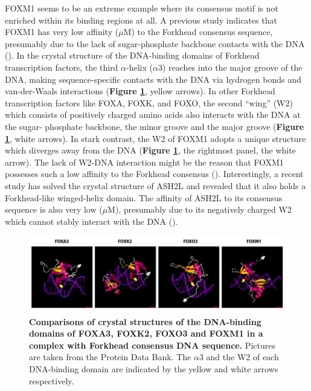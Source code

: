 FOXM1 seems to be an extreme example where its consensus motif is not enriched within its binding regions at all. A previous study indicates that FOXM1 has very low affinity ($\mu$M) to the Forkhead consensus sequence, presumably due to the lack of sugar-phosphate backbone contacts with the DNA (\cite{littler2010structure}). In the crystal structure of the DNA-binding domains of Forkhead transcription factors, the third $\alpha$-helix ($\alpha$3) reaches into the major groove of the DNA, making sequence-specific contacts with the DNA via hydrogen bonds and van-der-Waals interactions (\textbf{Figure \ref{fig:fig53}}, yellow arrows). In other Forkhead transcription factors like FOXA, FOXK, and FOXO, the second \enquote{wing} (W2) which consists of positively charged amino acids also interacts with the DNA at the sugar- phosphate backbone, the minor groove and the major groove (\textbf{Figure \ref{fig:fig53}}, white arrows). In stark contrast, the W2 of FOXM1 adopts a unique structure which diverges away from the DNA (\textbf{Figure \ref{fig:fig53}}, the rightmost panel, the white arrow). The lack of W2-DNA interaction might be the reason that FOXM1 possesses such a low affinity to the Forkhead consensus (\cite{littler2010structure}). Interestingly, a recent study has solved the crystal structure of ASH2L and revealed that it also holds a Forkhead-like winged-helix domain. The affinity of ASH2L to its consensus sequence is also very low ($\mu$M), presumably due to its negatively charged W2 which cannot stably interact with the DNA (\cite{sarvan2011crystal}).

\begin{figure}[!h]
    \centering
    \includegraphics[width=\textwidth]{chapter4/figures/fig53.pdf}
    \caption[Comparisons of crystal structures of the DNA-binding domains of FOXA3, FOXK2, FOXO3 and FOXM1 in a complex with Forkhead consensus DNA sequence]{\textbf{Comparisons of crystal structures of the DNA-binding domains of FOXA3, FOXK2, FOXO3 and FOXM1 in a complex with Forkhead consensus DNA sequence.} Pictures are taken from the Protein Data Bank. The $\alpha$3 and the W2 of each DNA-binding domain are indicated by the yellow and white arrows respectively.}
    \label{fig:fig53}
\end{figure}

